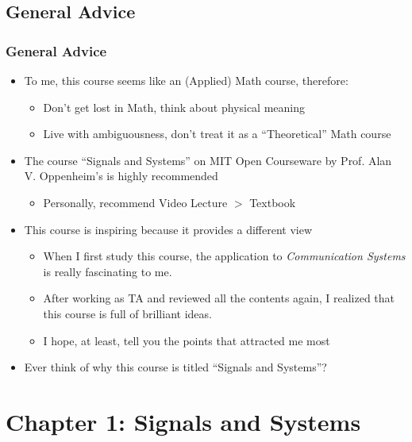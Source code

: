 \documentclass{beamer}
\begin{document}
\subsection{General Advice}
\begin{frame}
\frametitle{General Advice}
\begin{itemize}
\item To me, this course seems like an (Applied) Math course, therefore:
    \begin{itemize}
        \item Don't get lost in Math, think about physical meaning 
        \item Live with ambiguousness, don't treat it as a ``Theoretical'' Math course
    \end{itemize}
\item The course ``Signals and Systems'' on MIT Open Courseware by Prof. Alan V. Oppenheim's is highly recommended
\begin{itemize}
    \item Personally, recommend Video Lecture $>$ Textbook 
\end{itemize}

\item This course is inspiring because it provides a different view
\begin{itemize}
    \item When I first study this course, the application to \emph{Communication Systems} is really fascinating to me.
    \item After working as TA and reviewed all the contents again, I realized that this course is full of brilliant ideas.
    \item I hope, at least, tell you the points that attracted me most
\end{itemize}

\item Ever think of why this course is titled ``Signals and Systems''?

\end{itemize}
\end{frame}





\section{Chapter 1: Signals and Systems}
\end{document}
